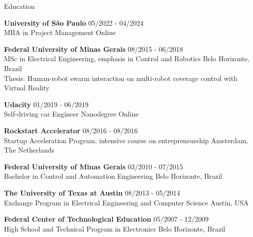 \documentclass[12pt, a4paper]{resume} %
\begin{document}

\begin{rSection}{Education}

	{\bf University of São Paulo}  \hfill{05/2022 - 04/2024} \\
	MBA in Project  Management \hfill{Online}

	{\bf Federal University of Minas Gerais}  \hfill{08/2015 - 06/2018} \\
	MSc in Electrical Engineering, emphasis in Control and Robotics \hfill{Belo Horizonte, Brazil} \\
	Thesis: Human-robot swarm interaction on multi-robot coverage control with Virtual Reality

		{\bf Udacity}  \hfill{01/2019 - 06/2019} \\
	Self-driving car Engineer Nanodegree \hfill{Online}

	{\bf Rockstart Accelerator}  \hfill{08/2016 - 08/2016} \\
	Startup Acceleration Program, intensive course on entrepreneurship \hfill{Amsterdam, The Netherlands}

	{\bf Federal University of Minas Gerais}  \hfill{03/2010 - 07/2015} \\
	Bachelor in Control and Automation Engineering \hfill{Belo Horizonte, Brazil}

	{\bf The University of Texas at Austin} \hfill {08/2013 - 05/2014} \\
	Exchange Program in Electrical Engineering and Computer Science \hfill {Austin, USA}

	{\bf Federal Center of Technological Education} \hfill {05/2007 - 12/2009} \\
	High School and Technical Program in Electronics \hfill{Belo Horizonte, Brazil}

\end{rSection}

\end{document}
